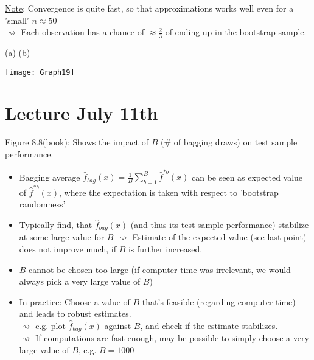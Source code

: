 \documentclass[11pt,a4paper,numbers=endperiod]{scrartcl}
\newcommand{\tit}[1]{\begin{large} \underline{\text{#1}}\end{large}}
\begin{document}
{\underline{Note}: Convergence is quite fast, so that approximations works well even for a 'small' $n \approx 50$\\
$\rightsquigarrow$ Each observation has a chance of $\approx \frac{2}{3}$ of ending up in the bootstrap sample.\\

\tit{Exercise 8.4/4}

(a)  \hspace*{35mm}  (b)\\

\texttt{[image: Graph19]}

\section{Lecture July 11th}

Figure 8.8(book): Shows the impact of $B$ (\# of bagging draws) on test sample performance. \begin{itemize}
	\item Bagging average $\hat{f}_{bag}(x) = \frac{1}{B} \sum\limits_{b = 1}^B \hat{f}^{*b}(x)$ can be seen as expected value of $\hat{f}^{*b}(x)$, where the expectation is taken with respect to 'bootstrap randomness' 
	\item Typically find, that $\hat{f}_{bag}(x)$ (and thus its test sample performance) stabilize at some large value for $B$ $\rightsquigarrow$ Estimate of the expected value (see last point) does not improve much, if $B$ is further increased. 
	\item  $B$ cannot be chosen too large (if computer time was irrelevant, we would always pick a very large value of $B$) 
	\item In practice: Choose a value of $B$ that's feasible (regarding computer time) and leads to robust estimates.\\
	$\rightsquigarrow$ e.g. plot $\hat{f}_{bag}(x)$ against $B$, and check if the estimate stabilizes.\\
	$\rightsquigarrow$ If computations are fast enough, may be possible to simply choose a very large value of $B$, e.g. $B = 1000$ 
\end{itemize}

}
\end{document}
